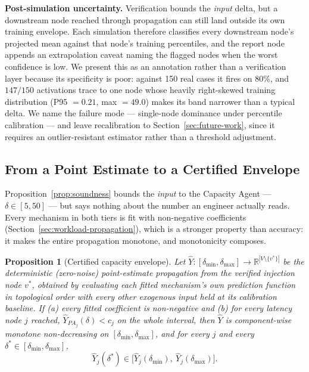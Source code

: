 \documentclass[journal, 10pt]{IEEEtran}
\newtheorem{proposition}{Proposition}
\begin{document}
\textbf{Post-simulation uncertainty.} Verification bounds the \emph{input} delta,
but a downstream node reached through propagation can still land outside its own
training envelope. Each simulation therefore classifies every downstream node's
projected mean against that node's training percentiles, and the report node
appends an extrapolation caveat naming the flagged nodes when the worst
confidence is low. We present this as an annotation rather than a verification
layer because its specificity is poor: against 150 real cases it fires on $80\%$,
and $147/150$ activations trace to one node whose heavily right-skewed training
distribution (P95 $=0.21$, max $=49.0$) makes its band narrower than a typical
delta. We name the failure mode --- single-node dominance under percentile
calibration --- and leave recalibration to Section~\ref{sec:future-work}, since
it requires an outlier-resistant estimator rather than a threshold adjustment.

\subsection{From a Point Estimate to a Certified Envelope}
\label{sec:certified-envelope}
Proposition~\ref{prop:soundness} bounds the \emph{input} to the Capacity Agent
--- $\delta\in[5,50]$ --- but says nothing about the number an engineer actually
reads. Every mechanism in both tiers is fit with non-negative coefficients
(Section~\ref{sec:workload-propagation}), which is a stronger property than
accuracy: it makes the entire propagation monotone, and monotonicity composes.

\begin{proposition}[Certified capacity envelope]
\label{prop:envelope}
Let $\hat{Y}:[\delta_{\min},\delta_{\max}]\to\mathbb{R}^{|V\setminus\{v^*\}|}$ be
the deterministic (zero-noise) point-estimate propagation from the verified
injection node $v^*$, obtained by evaluating each fitted mechanism's own
prediction function in topological order with every other exogenous input held
at its calibration baseline. If \emph{(a)} every fitted coefficient is
non-negative and \emph{(b)} for every latency node $j$ reached,
$\hat{Y}_{PA_j}(\delta) < c_j$ on the whole interval, then $\hat{Y}$ is
component-wise monotone non-decreasing on $[\delta_{\min},\delta_{\max}]$, and
for every $j$ and every $\delta^*\in[\delta_{\min},\delta_{\max}]$,
\begin{equation}
\hat{Y}_j(\delta^*) \in \big[\hat{Y}_j(\delta_{\min}),\ \hat{Y}_j(\delta_{\max})\big].
\label{eq:envelope}
\end{equation}
\end{proposition}
\end{document}

